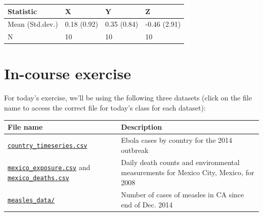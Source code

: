 \documentclass[]{book}
\theoremstyle{definition}
\theoremstyle{definition}
\theoremstyle{definition}
\theoremstyle{remark}
\begin{document}
\begin{tabular}{l|l|l|l}
\hline
Statistic & X & Y & Z\\
\hline
Mean (Std.dev.) & 0.18 (0.92) & 0.35 (0.84) & -0.46 (2.91)\\
\hline
N & 10 & 10 & 10\\
\hline
\end{tabular}

\section{In-course exercise}\label{in-course-exercise-5}

For today's exercise, we'll be using the following three datasets (click
on the file name to access the correct file for today's class for each
dataset):

\begin{longtable}[]{@{}ll@{}}
\toprule
\begin{minipage}[b]{0.27\columnwidth}\raggedright\strut
File name\strut
\end{minipage} & \begin{minipage}[b]{0.63\columnwidth}\raggedright\strut
Description\strut
\end{minipage}\tabularnewline
\midrule
\endhead
\begin{minipage}[t]{0.27\columnwidth}\raggedright\strut
\href{https://github.com/geanders/RProgrammingForResearch/raw/master/data/country_timeseries.csv}{\texttt{country\_timeseries.csv}}\strut
\end{minipage} & \begin{minipage}[t]{0.63\columnwidth}\raggedright\strut
Ebola cases by country for the 2014 outbreak\strut
\end{minipage}\tabularnewline
\begin{minipage}[t]{0.27\columnwidth}\raggedright\strut
\href{https://github.com/geanders/RProgrammingForResearch/raw/master/data/mexico_exposure.csv}{\texttt{mexico\_exposure.csv}}
and
\href{https://github.com/geanders/RProgrammingForResearch/raw/master/data/mexico_deaths.csv}{\texttt{mexico\_deaths.csv}}\strut
\end{minipage} & \begin{minipage}[t]{0.63\columnwidth}\raggedright\strut
Daily death counts and environmental measurements for Mexico City,
Mexico, for 2008\strut
\end{minipage}\tabularnewline
\begin{minipage}[t]{0.27\columnwidth}\raggedright\strut
\href{https://github.com/geanders/RProgrammingForResearch/tree/master/data/measles_data}{\texttt{measles\_data/}}\strut
\end{minipage} & \begin{minipage}[t]{0.63\columnwidth}\raggedright\strut
Number of cases of measles in CA since end of Dec. 2014\strut
\end{minipage}\tabularnewline
\bottomrule
\end{longtable}
\end{document}
